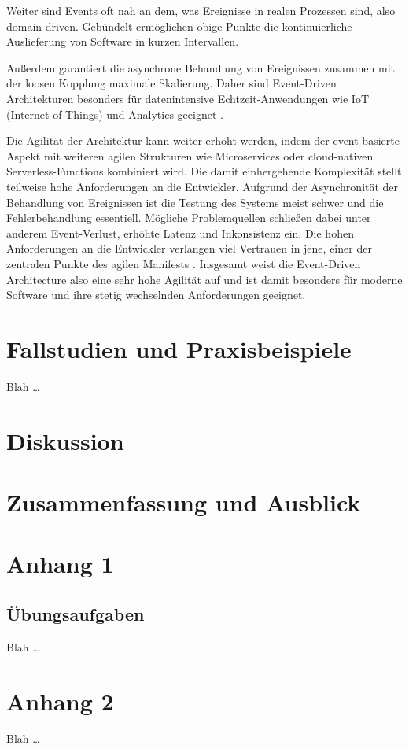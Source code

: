 \documentclass[acmtog]{acmart}
\begin{document}
Weiter sind Events oft nah an dem, was Ereignisse in realen Prozessen sind, also domain-driven.
Gebündelt ermöglichen obige Punkte die kontinuierliche Auslieferung von Software in kurzen Intervallen.

Außerdem garantiert die asynchrone Behandlung von Ereignissen zusammen mit der loosen Kopplung maximale Skalierung.
Daher sind Event-Driven Architekturen besonders für datenintensive Echtzeit-Anwendungen wie IoT (Internet of Things) und Analytics geeignet \cite{iotEda}.

Die Agilität der Architektur kann weiter erhöht werden, indem der event-basierte Aspekt mit weiteren agilen Strukturen wie Microservices oder cloud-nativen Serverless-Functions kombiniert wird.
Die damit einhergehende Komplexität stellt teilweise hohe Anforderungen an die Entwickler.
Aufgrund der Asynchronität der Behandlung von Ereignissen ist die Testung des Systems meist schwer und die Fehlerbehandlung essentiell.
Mögliche Problemquellen schließen dabei unter anderem Event-Verlust, erhöhte Latenz und Inkonsistenz ein.
Die hohen Anforderungen an die Entwickler verlangen viel Vertrauen in jene, einer der zentralen Punkte des agilen Manifests \cite{agileManifesto}.
Insgesamt weist die Event-Driven Architecture also eine sehr hohe Agilität auf und ist damit besonders für moderne Software und ihre stetig wechselnden Anforderungen geeignet.


\section{Fallstudien und Praxisbeispiele}
Blah \ldots

\section{Diskussion}

\section{Zusammenfassung und Ausblick}









\appendix

\section{Anhang 1}

\subsection{Übungsaufgaben}
Blah \ldots

\section{Anhang 2}
Blah \ldots
\end{document}
